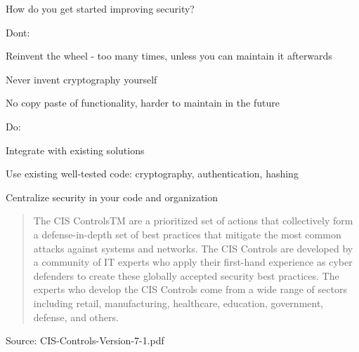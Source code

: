 \documentclass[Screen16to9,17pt]{foils}
\begin{document}
How do you get started improving security?


\begin{list1}
\item Dont:
\begin{list2}
\item Reinvent the wheel - too many times, unless you can maintain it afterwards
\item Never invent cryptography yourself
\item No copy paste of functionality, harder to maintain in the future
\end{list2}
\item Do:
\begin{list2}
\item Integrate with existing solutions
\item Use existing well-tested code: cryptography, authentication, hashing
\item Centralize security in your code and organization
\end{list2}
\end{list1}


\begin{quote}
  The CIS ControlsTM are a prioritized set of actions that collectively form a defense-in-depth set
of best practices that mitigate the most common attacks against systems and networks. The
CIS Controls are developed by a community of IT experts who apply their first-hand experience
as cyber defenders to create these globally accepted security best practices. The experts who
develop the CIS Controls come from a wide range of sectors including retail, manufacturing,
healthcare, education, government, defense, and others.
\end{quote}

Source:  CIS-Controls-Version-7-1.pdf

\end{document}
